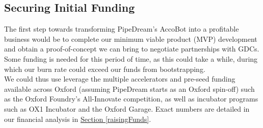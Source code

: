 \documentclass[11pt]{article}		%
\newcommand{\sectref}[1]{\hyperref[#1]{Section \ref*{#1}}}     %
\begin{document}
	\subsection{Securing Initial Funding}
	The first step towards transforming PipeDream’s AccoBot into a profitable business would be to complete our minimum viable product (MVP) development and obtain a proof-of-concept we can bring to negotiate partnerships with GDCs. Some funding is needed for this period of time, as this could take a while, during which our burn rate could exceed our funds from bootstrapping. 
    \\ \hspace*{3ex} We could thus use leverage the multiple accelerators and pre-seed funding available across Oxford (assuming PipeDream starts as an Oxford spin-off) such as the Oxford Foundry’s All-Innovate competition, as well as incubator programs such as OX1 Incubator and the Oxford Garage. Exact numbers are detailed in our financial analysis in \sectref{raisingFunds}. 
\end{document}
